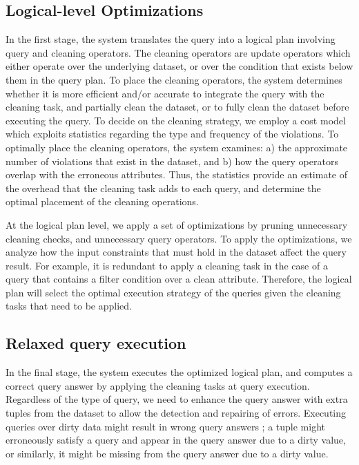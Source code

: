 \subsection{Logical-level Optimizations} 
In the first stage, the system translates the query into a logical plan involving query and
cleaning operators. The cleaning operators are update operators which either operate over the underlying 
dataset, or over the condition that exists below them in the query plan.
To place the cleaning operators, the system determines whether it is more efficient and/or accurate to integrate the 
query with the cleaning task, and partially clean the dataset, or to fully clean the dataset before executing the query. To decide on the cleaning strategy, 
we employ a cost model which exploits statistics regarding the type and frequency of the violations.
To optimally place the cleaning operators, the system examines: a) the approximate number of violations that exist in the dataset, and 
b) how the query operators overlap with the erroneous attributes. Thus, the statistics provide an estimate of the overhead that the cleaning task adds to each query, and determine the optimal placement of the cleaning operations.


At the logical plan level, we apply a set of optimizations by pruning unnecessary cleaning checks,
and unnecessary query operators. To apply the optimizations, we
analyze how the input constraints that must hold in the dataset affect the query result.
For example, it is redundant to apply a cleaning task in the case of a query that contains a filter condition over a clean attribute.
Therefore, the logical plan will select the optimal execution strategy of the queries given the cleaning tasks that need to be applied.

\subsection{Relaxed query execution}
In the final stage, the system executes the optimized logical plan, and computes
a correct query answer by applying the cleaning tasks at query execution. 
Regardless of the type of query, we need to enhance the query answer with extra tuples from the dataset to allow the detection and repairing of errors.
Executing queries over dirty data might result in wrong query answers \cite{incomplete_dbs}; a tuple might erroneously satisfy a query and appear in the query answer
due to a dirty value, or similarly, it might be missing from the query answer due to a dirty value. 

